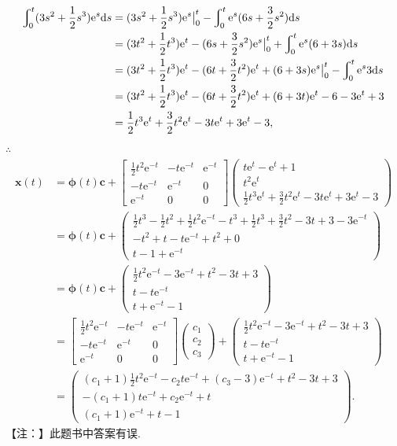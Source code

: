 \documentclass[12pt,UTF8]{ctexart}
\newcommand{\Int}[4]{\varint\nolimits_{#1}^{#2}#3\mathrm d#4}
\newcommand{\me}[0]{\mathrm e}
\begin{document}
\begin{enumerate}
\[\begin{aligned}
\Int0t{(3s^2+\frac12s^3)\me^s}s&=(3s^2+\frac12s^3)\me^s\big|_0^t-\Int0t{\me^s(6s+\frac32s^2)}s\\
&=(3t^2+\frac12t^3)\me^t-(6s+\frac32s^2)\me^s\big|_0^t+\Int0t{\me^s(6+3s)}s\\
&=(3t^2+\frac12t^3)\me^t-(6t+\frac32t^2)\me^t+(6+3s)\me^s\big|_0^t-\Int0t{\me^s3}s\\
&=(3t^2+\frac12t^3)\me^t-(6t+\frac32t^2)\me^t+(6+3t)\me^t-6-3\me^t+3\\
&=\frac12t^3\me^t+\frac32t^2\me^t-3t\me^t+3\me^t-3,
\end{aligned}\]
$\therefore$
\[\begin{aligned}
\bm x(t)&=\bm\phi(t)\bm c+\begin{bmatrix}
\frac12t^2\me^{-t}&-t\me^{-t}&\me^{-t}\\-t\me^{-t}&\me^{-t}&0\\\me^{-t}&0&0
\end{bmatrix}\begin{pmatrix}
t\me^t-\me^t+1\\
t^2\me^t\\
\frac12t^3\me^t+\frac32t^2\me^t-3t\me^t+3\me^t-3
\end{pmatrix}\\
&=\bm\phi(t)\bm c+\begin{pmatrix}
\frac12t^3-\frac12t^2+\frac12t^2\me^{-t}-t^3+\frac12t^3+\frac32t^2-3t+3-3\me^{-t}\\
-t^2+t-t\me^{-t}+t^2+0\\
t-1+\me^{-t}
\end{pmatrix}\\
&=\bm\phi(t)\bm c+\begin{pmatrix}
\frac12t^2\me^{-t}-3\me^{-t}+t^2-3t+3\\
t-t\me^{-t}\\
t+\me^{-t}-1
\end{pmatrix}\\
&=\begin{bmatrix}
\frac12t^2\me^{-t}&-t\me^{-t}&\me^{-t}\\-t\me^{-t}&\me^{-t}&0\\\me^{-t}&0&0
\end{bmatrix}\begin{pmatrix}
c_1\\c_2\\c_3
\end{pmatrix}+\begin{pmatrix}
\frac12t^2\me^{-t}-3\me^{-t}+t^2-3t+3\\
t-t\me^{-t}\\
t+\me^{-t}-1
\end{pmatrix}\\
&=\begin{pmatrix}
(c_1+1)\frac12t^2\me^{-t}-c_2t\me^{-t}+(c_3-3)\me^{-t}+t^2-3t+3\\
-(c_1+1)t\me^{-t}+c_2\me^{-t}+t\\
(c_1+1)\me^{-t}+t-1
\end{pmatrix}.
\end{aligned}\]
【注：】此题书中答案有误.


\end{enumerate}
\end{document}
